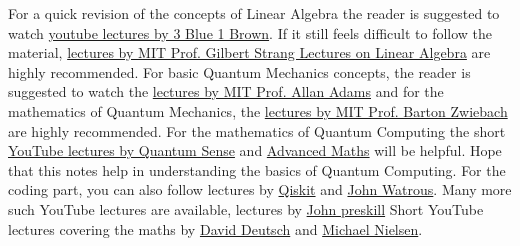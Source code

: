 For a quick revision of the concepts of Linear Algebra the 
reader is suggested to watch \href{https://www.youtube.com/watch?v=fNk_zzaMoSs&list=PLZHQObOWTQDPD3MizzM2xVFitgF8hE_ab}{youtube lectures by 3 Blue 1 Brown}. If it still feels 
difficult to follow the material, \href{https://www.youtube.com/watch?v=7UJ4CFRGd-U&list=PL221E2BBF13BECF6C}{lectures by MIT Prof. Gilbert
Strang Lectures on Linear Algebra} are highly recommended. For basic Quantum Mechanics
concepts, the reader is suggested to watch the \href{https://www.youtube.com/watch?v=lZ3bPUKo5zc&list=PLUl4u3cNGP61-9PEhRognw5vryrSEVLPr}{lectures by MIT Prof. Allan Adams} and for the mathematics
of Quantum Mechanics, the \href{https://www.youtube.com/watch?v=jANZxzetPaQ&list=PLUl4u3cNGP60cspQn3N9dYRPiyVWDd80G}{lectures by MIT Prof. Barton Zwiebach} are highly recommended. For the 
mathematics of Quantum Computing the short \href{https://www.youtube.com/watch?v=3nvbBEzfmE8&list=PL8ER5-vAoiHAWm1UcZsiauUGPlJChgNXC}{YouTube lectures by Quantum Sense} and \href{https://www.youtube.com/watch?v=zm64o27eHYw&list=PLxP0p--aBHmIe--9rczWe4AZmw03e2bz0}{Advanced Maths} will be helpful. Hope that this
notes help in understanding the basics of Quantum Computing. 
For the coding part, you can also follow lectures by \href{https://www.youtube.com/watch?v=Rs2TzarBX5I&list=PLOFEBzvs-VvrXTMy5Y2IqmSaUjfnhvBHR}{Qiskit} and \href{https://www.youtube.com/watch?v=42OiBzfdE2o&list=PLOFEBzvs-VvqKKMXX4vbi4EB1uaErFMSO}{John Watrous}.
Many more such YouTube lectures are available, lectures by \href{https://www.youtube.com/watch?v=w08pSFsAZvE&list=PL0ojjrEqIyPy-1RRD8cTD_lF1hflo89Iu}{John preskill} 
Short YouTube lectures covering the maths by \href{https://www.youtube.com/watch?v=mpkYPEaifUg&list=PLqdVnC7OWuEcfKRZXsrooK_EPzwmWSi-N}{David Deutsch} and \href{https://www.youtube.com/watch?v=X2q1PuI2RFI&list=PL1826E60FD05B44E4}{Michael Nielsen}.


